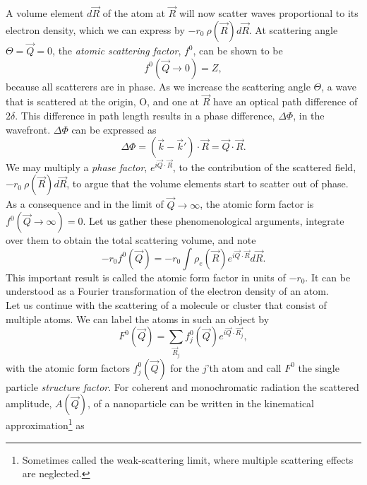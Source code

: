 %
A volume element $d\vec{R}$ of the atom at $\vec{R}$ will now scatter waves proportional to its electron density, which we can express by $-r_{0}\ \rho\left(\vec{R}\right)d\vec{R}$. At scattering angle $\Theta=\vec{Q}=0$, the \textit{atomic scattering factor}, $f^{0}$, can be shown to be
\begin{equation}
f^{0}\left(\vec{Q}\rightarrow 0\right)=Z,
\label{eq:transform-number-of-particles}
\end{equation}
because all scatterers are in phase. As we increase the scattering angle $\Theta$, a wave that is scattered at the origin, O, and one at $\vec{R}$ have an optical path difference of $2 \delta$. This difference in path length results in a phase difference, $\Delta \Phi$, in the wavefront. $\Delta \Phi$ can be expressed as 
\begin{equation}
\Delta \Phi = \left(\vec{k}-\vec{k}'\right)\cdot \vec{R} = \vec{Q}\cdot \vec{R}.
\label{eq:phase-difference}
\end{equation}
We may multiply a \textit{phase factor}, $e^{i \vec{Q}\cdot \vec{R}}$, to the contribution of the scattered field, $-r_{0}\ \rho\left(\vec{R}\right)d\vec{R}$, to argue that the volume elements start to scatter out of phase. As a consequence and in the limit of $\vec{Q}\rightarrow\infty$, the atomic form factor is $f^{0}\left(\vec{Q}\rightarrow\infty\right)=0$. Let us gather these phenomenological arguments, integrate over them to obtain the total scattering volume, and note
\begin{equation}
-r_{0} f^{0}\left(\vec{Q}\right)=-r_{0}\int\rho_{e}\left(\vec{R}\right)e^{i \vec{Q}\cdot \vec{R}}d\vec{R}.
\label{eq:scattering-integral}
\end{equation}
This important result is called the atomic form factor in units of $-r_{0}$. It can be understood as a Fourier transformation of the electron density of an atom.\\[1\baselineskip]
%
Let us continue with the scattering of a molecule or cluster that consist of multiple atoms. We can label the atoms in such an object by
\begin{equation}
F^{0}\left(\vec{Q}\right)=\sum_{\vec{R}_j}f_{j}^{0}\left(\vec{Q}\right)e^{i \vec{Q}\cdot \vec{R_{j}}},
\label{eq:scattering-factor-object}
\end{equation}
with the atomic form factors $f_{j}^{0}\left(\vec{Q}\right)$ for the $j$'th atom and call $F^{0}$ the single particle \textit{structure factor}. For coherent and monochromatic radiation the scattered amplitude, $A(\vec{Q})$, of a nanoparticle can be written in the kinematical approximation\footnote{Sometimes called the weak-scattering limit, where multiple scattering effects are neglected.} as \citep{Vartanyants-2001-JOP}
